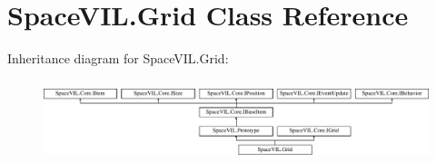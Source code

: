 \hypertarget{class_space_v_i_l_1_1_grid}{}\section{Space\+V\+I\+L.\+Grid Class Reference}
\label{class_space_v_i_l_1_1_grid}
Inheritance diagram for Space\+V\+I\+L.\+Grid\+:\begin{figure}[H]
\begin{center}
\leavevmode
\includegraphics[height=2.421622cm]{class_space_v_i_l_1_1_grid}
\end{center}
\end{figure}
